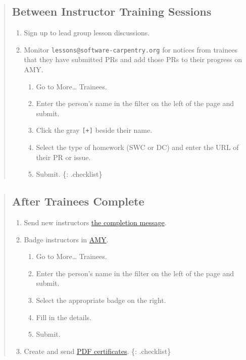 \begin{quote}
\subsection{Between Instructor Training
Sessions}\label{between-instructor-training-sessions}

\begin{enumerate}
\def\labelenumi{\arabic{enumi}.}
\itemsep1pt\parskip0pt
\item
  Sign up to lead group lesson discussions.
\item
  Monitor \texttt{lessons@software-carpentry.org} for notices from
  trainees that they have submitted PRs and add those PRs to their
  progress on AMY.

  \begin{enumerate}
  \def\labelenumii{\arabic{enumii}.}
  \itemsep1pt\parskip0pt
  \item
    Go to More\ldots{} Trainees.
  \item
    Enter the person's name in the filter on the left of the page and
    submit.
  \item
    Click the gray \texttt{{[}+{]}} beside their name.
  \item
    Select the type of homework (SWC or DC) and enter the URL of their
    PR or issue.
  \item
    Submit. \{: .checklist\}
  \end{enumerate}
\end{enumerate}
\end{quote}

\begin{quote}
\subsection{After Trainees Complete}\label{after-trainees-complete}

\begin{enumerate}
\def\labelenumi{\arabic{enumi}.}
\itemsep1pt\parskip0pt
\item
  Send new instructors
  \href{\{\{\%20page.root\%20\}\}/files/messages/completion.txt}{the
  completion message}.
\item
  Badge instructors in \href{\{\{\%20site.amy_site\%20\}\}/}{AMY}.

  \begin{enumerate}
  \def\labelenumii{\arabic{enumii}.}
  \itemsep1pt\parskip0pt
  \item
    Go to More\ldots{} Trainees.
  \item
    Enter the person's name in the filter on the left of the page and
    submit.
  \item
    Select the appropriate badge on the right.
  \item
    Fill in the details.
  \item
    Submit.
  \end{enumerate}
\item
  Create and send
  \href{\{\{\%20site.swc_github\%20\}\}/certification}{PDF
  certificates}. \{: .checklist\}
\end{enumerate}
\end{quote}

